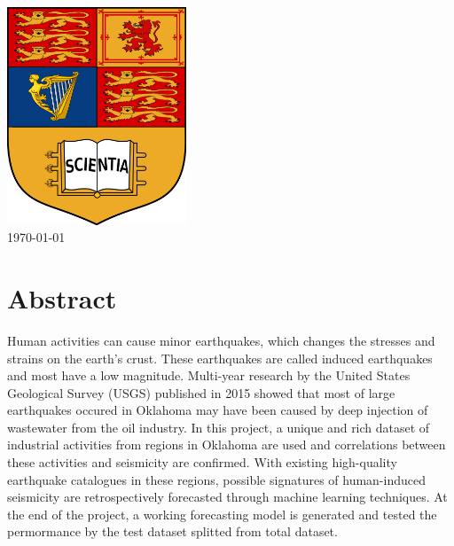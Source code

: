 \documentclass[final-report]{report-template}
\begin{document}
\begin{titlepage}

\includegraphics[width=0.4\textwidth]{school.png}\\[4cm] %
 



{\large \today}\\[2cm] %


\vfill %

\end{titlepage}



\githubrepo  %

\section*{Abstract}
Human activities can cause minor earthquakes, which changes the stresses and strains on the earth's crust.
These earthquakes are called induced earthquakes and most have a low magnitude. 
Multi-year research by the United States Geological Survey (USGS) published in 2015 showed that most of large earthquakes occured in Oklahoma may have been caused by deep injection of wastewater from the oil industry.
In this project, a unique and rich dataset of industrial activities from regions in Oklahoma are used and correlations between these activities and seismicity are confirmed.
With existing high-quality earthquake catalogues in these regions, possible signatures of human-induced seismicity are retrospectively forecasted through machine learning techniques. 
At the end of the project, a working forecasting model is generated and tested the permormance by the test dataset splitted from total dataset.
\end{document}
